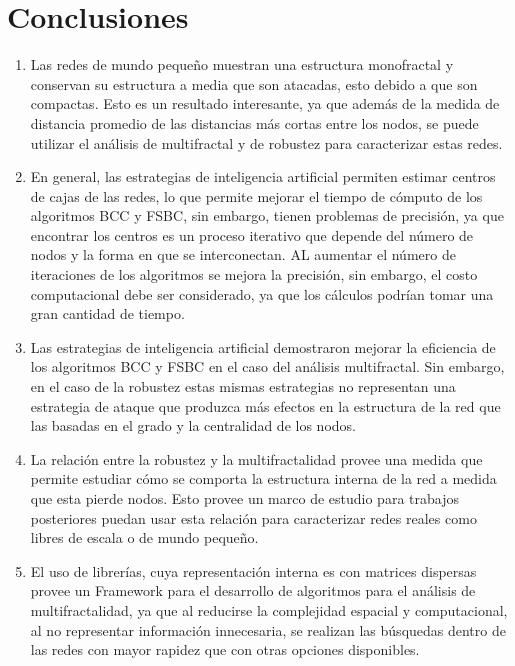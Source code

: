 \section{Conclusiones}

\begin{enumerate}
    \item Las redes de mundo pequeño muestran una estructura monofractal y conservan su estructura a media que son atacadas, esto debido a que son compactas. Esto es un resultado interesante, ya que además de la medida de distancia promedio de las distancias más cortas entre los nodos, se puede utilizar el análisis de multifractal y de robustez para caracterizar estas redes.
    \item En general, las estrategias de inteligencia artificial permiten estimar centros de cajas de las redes, lo que permite mejorar el tiempo de cómputo de los algoritmos BCC y FSBC, sin embargo, tienen problemas de precisión, ya que encontrar los centros es un proceso iterativo que depende del número de nodos y la forma en que se interconectan. AL aumentar el número de iteraciones de los algoritmos se mejora la precisión, sin embargo, el costo computacional debe ser considerado, ya que los cálculos podrían tomar una gran cantidad de tiempo.
    \item Las estrategias de inteligencia artificial demostraron mejorar la eficiencia de los algoritmos BCC y FSBC en el caso del análisis multifractal. Sin embargo, en el caso de la robustez estas mismas estrategias no representan una estrategia de ataque que produzca más efectos en la estructura de la red que las basadas en el grado y la centralidad de los nodos.
    \item La relación entre la robustez y la multifractalidad provee una medida que permite estudiar cómo se comporta la estructura interna de la red a medida que esta pierde nodos. Esto provee un marco de estudio para trabajos posteriores puedan usar esta relación para caracterizar redes reales como libres de escala o de mundo pequeño. 
    \item El uso de librerías, cuya representación interna es con matrices dispersas provee un Framework para el desarrollo de algoritmos para el análisis de multifractalidad, ya que al reducirse la complejidad espacial y computacional, al no representar información innecesaria, se realizan las búsquedas dentro de las redes con mayor rapidez que con otras opciones disponibles.
\end{enumerate}